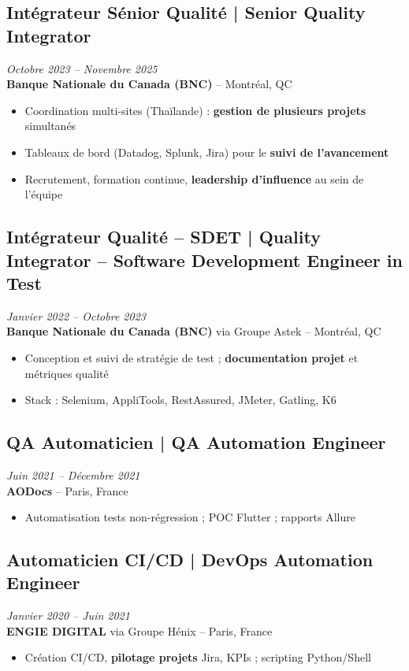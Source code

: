 \documentclass[11pt,a4paper]{article}
\begin{document}
\subsection*{Intégrateur Sénior Qualité | Senior Quality Integrator} \hfill \textit{Octobre 2023 -- Novembre 2025}\\
\textbf{Banque Nationale du Canada (BNC)} -- Montréal, QC\\
\begin{itemize}
    \item Coordination multi-sites (Thaïlande) : \textbf{gestion de plusieurs projets} simultanés
    \item Tableaux de bord (Datadog, Splunk, Jira) pour le \textbf{suivi de l'avancement}
    \item Recrutement, formation continue, \textbf{leadership d'influence} au sein de l'équipe
\end{itemize}

\subsection*{Intégrateur Qualité -- SDET | Quality Integrator -- Software Development Engineer in Test} \hfill \textit{Janvier 2022 -- Octobre 2023}\\
\textbf{Banque Nationale du Canada (BNC)} via Groupe Astek -- Montréal, QC\\
\begin{itemize}
    \item Conception et suivi de stratégie de test ; \textbf{documentation projet} et métriques qualité
    \item Stack : Selenium, AppliTools, RestAssured, JMeter, Gatling, K6
\end{itemize}

\subsection*{QA Automaticien | QA Automation Engineer} \hfill \textit{Juin 2021 -- Décembre 2021}\\
\textbf{AODocs} -- Paris, France\\
\begin{itemize}
    \item Automatisation tests non-régression ; POC Flutter ; rapports Allure
\end{itemize}

\subsection*{Automaticien CI/CD | DevOps Automation Engineer} \hfill \textit{Janvier 2020 -- Juin 2021}\\
\textbf{ENGIE DIGITAL} via Groupe Hénix -- Paris, France\\
\begin{itemize}
    \item Création CI/CD, \textbf{pilotage projets} Jira, KPIs ; scripting Python/Shell
\end{itemize}
\end{document}
